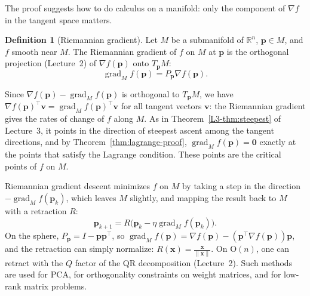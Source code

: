 \documentclass[11pt]{article}
\newcommand{\norm}[1]{\lVert #1 \rVert}
\theoremstyle{definition}
\newtheorem{definition}{Definition}[section]
\theoremstyle{plain}
\theoremstyle{remark}
\DeclareMathOperator{\grad}{grad}
\begin{document}
The proof suggests how to do calculus on a manifold: only the component of $\nabla f$ in the tangent space matters.

\begin{definition}[Riemannian gradient]\label{def:riemannian-gradient}
    Let $M$ be a submanifold of $\mathbb{R}^n$, $\mathbf{p} \in M$, and $f$ smooth near $M$. The Riemannian gradient of $f$ on $M$ at $\mathbf{p}$ is the orthogonal projection (Lecture~2) of $\nabla f(\mathbf{p})$ onto $T_{\mathbf{p}}M$:
    \[\grad_M f(\mathbf{p}) = P_{\mathbf{p}}\nabla f(\mathbf{p}).\]
\end{definition}

Since $\nabla f(\mathbf{p}) - \grad_M f(\mathbf{p})$ is orthogonal to $T_{\mathbf{p}}M$, we have $\nabla f(\mathbf{p})^\top\mathbf{v} = \grad_M f(\mathbf{p})^\top\mathbf{v}$ for all tangent vectors $\mathbf{v}$: the Riemannian gradient gives the rates of change of $f$ along $M$. As in Theorem~\ref{L3-thm:steepest} of Lecture~3, it points in the direction of steepest ascent among the tangent directions, and by Theorem~\ref{thm:lagrange-proof}, $\grad_M f(\mathbf{p}) = \mathbf{0}$ exactly at the points that satisfy the Lagrange condition. These points are the critical points of $f$ on $M$.

Riemannian gradient descent minimizes $f$ on $M$ by taking a step in the direction $-\grad_M f(\mathbf{p}_k)$, which leaves $M$ slightly, and mapping the result back to $M$ with a retraction $R$:
\[\mathbf{p}_{k+1} = R\big(\mathbf{p}_k - \eta\grad_M f(\mathbf{p}_k)\big).\]
On the sphere, $P_{\mathbf{p}} = I - \mathbf{p}\mathbf{p}^\top$, so $\grad_M f(\mathbf{p}) = \nabla f(\mathbf{p}) - (\mathbf{p}^\top\nabla f(\mathbf{p}))\mathbf{p}$, and the retraction can simply normalize: $R(\mathbf{x}) = \frac{\mathbf{x}}{\norm{\mathbf{x}}}$. On $\mathrm{O}(n)$, one can retract with the $Q$ factor of the QR decomposition (Lecture~2). Such methods are used for PCA, for orthogonality constraints on weight matrices, and for low-rank matrix problems.
\end{document}
